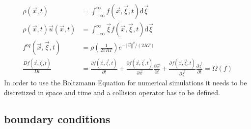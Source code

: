 \begin{align}
	\rho(\vec{x}, t) &= \int_{-\infty}^{\infty} f(\vec{x}, \vec{\xi}, t) \mathrm{d}\vec{\xi} \label{eq:rho} \\
	\rho(\vec{x}, t) \vec{u}(\vec{x}, t) &= \int_{-\infty}^{\infty} \vec{\xi} f(\vec{x}, \vec{\xi}, t) \mathrm{d}\vec{\xi} \label{eq:velocity}\\
	f^{eq} (\vec{x}, \vec{\xi}, t) &= \rho\left(\frac{1}{2 \pi RT}\right) e^{-\Vert \vec{v} \Vert^2/(2RT) } \label{eq:equilibrium} \\
	\frac{D f(\vec{x}, \vec{\xi}, t)}{Dt} &= \frac{ \partial f(\vec{x}, \vec{\xi}, t)}{\partial t} + \frac{ \partial f(\vec{x}, \vec{\xi}, t)}{\partial\vec{x}} \frac{\partial \vec{x}}{\partial t} + \frac{ \partial f(\vec{x}, \vec{\xi}, t)}{\partial \vec{\xi}} \frac{\partial \vec{\xi}}{\partial t} =  \Omega(f) \label{eq:boltzmann}
\end{align}
In order to use the Boltzmann Equation for numerical simulations it needs to be discretized in space and time and a collision operator has to be defined.

\subsection{boundary conditions}